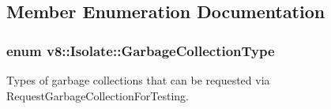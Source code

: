 \subsection{Member Enumeration Documentation}
\hypertarget{classv8_1_1Isolate_a5ae00cc99d8aca148c6f5f9698c432c9}{
\subsubsection[{Garbage\-Collection\-Type}]{\setlength{\rightskip}{0pt plus 5cm}enum {\bf v8\-::\-Isolate\-::\-Garbage\-Collection\-Type}}}\label{classv8_1_1Isolate_a5ae00cc99d8aca148c6f5f9698c432c9}
Types of garbage collections that can be requested via Request\-Garbage\-Collection\-For\-Testing. 

